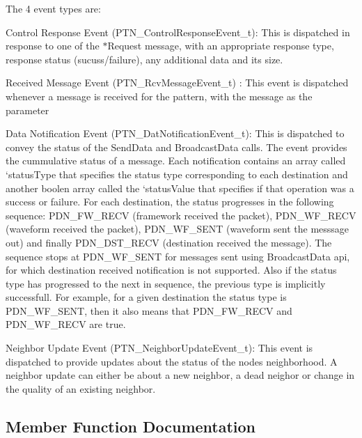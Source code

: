 The 4 event types are\+:


\begin{DoxyEnumerate}
\item Control Response Event (P\+T\+N\+\_\+\+Control\+Response\+Event\+\_\+t)\+: This is dispatched in response to one of the $\ast$\+Request message, with an appropriate response type, response status (sucuss/failure), any additional data and its size.
\item Received Message Event (P\+T\+N\+\_\+\+Rcv\+Message\+Event\+\_\+t) \+: This event is dispatched whenever a message is received for the pattern, with the message as the parameter
\item Data Notification Event (P\+T\+N\+\_\+\+Dat\+Notification\+Event\+\_\+t)\+: This is dispatched to convey the status of the Send\+Data and Broadcast\+Data calls. The event provides the cummulative status of a message. Each notification contains an array called `status\+Type\textquotesingle{} that specifies the status type corresponding to each destination and another boolen array called the `status\+Value\textquotesingle{} that specifies if that operation was a success or failure. For each destination, the status progresses in the following sequence\+: P\+D\+N\+\_\+\+F\+W\+\_\+\+R\+E\+CV (framework received the packet), P\+D\+N\+\_\+\+W\+F\+\_\+\+R\+E\+CV (waveform received the packet), P\+D\+N\+\_\+\+W\+F\+\_\+\+S\+E\+NT (waveform sent the messsage out) and finally P\+D\+N\+\_\+\+D\+S\+T\+\_\+\+R\+E\+CV (destination received the message). The sequence stops at P\+D\+N\+\_\+\+W\+F\+\_\+\+S\+E\+NT for messages sent using Broadcast\+Data api, for which destination received notification is not supported. Also if the status type has progressed to the next in sequence, the previous type is implicitly successfull. For example, for a given destination the status type is \textquotesingle{}P\+D\+N\+\_\+\+W\+F\+\_\+\+S\+E\+NT\textquotesingle{}, then it also means that P\+D\+N\+\_\+\+F\+W\+\_\+\+R\+E\+CV and P\+D\+N\+\_\+\+W\+F\+\_\+\+R\+E\+CV are true.
\item Neighbor Update Event (P\+T\+N\+\_\+\+Neighbor\+Update\+Event\+\_\+t)\+: This event is dispatched to provide updates about the status of the nodes neighborhood. A neighbor update can either be about a new neighbor, a dead neighor or change in the quality of an existing neighbor. 
\end{DoxyEnumerate}

\subsection{Member Function Documentation}

